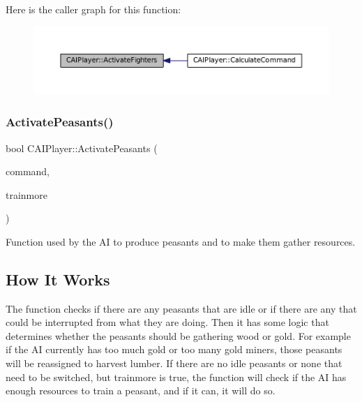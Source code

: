 Here is the caller graph for this function\+:\nopagebreak
\begin{figure}[H]
\begin{center}
\leavevmode
\includegraphics[width=350pt]{classCAIPlayer_a4216d7e76315234a4fe22fb3a0a89c1d_icgraph}
\end{center}
\end{figure}
\hypertarget{classCAIPlayer_a3fab1c955fd68bb53fa80bb1872d2819}{}\label{classCAIPlayer_a3fab1c955fd68bb53fa80bb1872d2819} 
\subsubsection{\texorpdfstring{Activate\+Peasants()}{ActivatePeasants()}}
{\footnotesize\ttfamily bool C\+A\+I\+Player\+::\+Activate\+Peasants (\begin{DoxyParamCaption}\item[{\hyperlink{structSPlayerCommandRequest}{S\+Player\+Command\+Request} \&}]{command,  }\item[{bool}]{trainmore }\end{DoxyParamCaption})\hspace{0.3cm}{\ttfamily [protected]}}



Function used by the AI to produce peasants and to make them gather resources. 

\hypertarget{classCAIPlayer_aphow_sec}{}\subsection{How It Works}\label{classCAIPlayer_aphow_sec}
The function checks if there are any peasants that are idle or if there are any that could be interrupted from what they are doing. Then it has some logic that determines whether the peasants should be gathering wood or gold. For example if the AI currently has too much gold or too many gold miners, those peasants will be reassigned to harvest lumber. If there are no idle peasants or none that need to be switched, but trainmore is true, the function will check if the AI has enough resources to train a peasant, and if it can, it will do so. 

